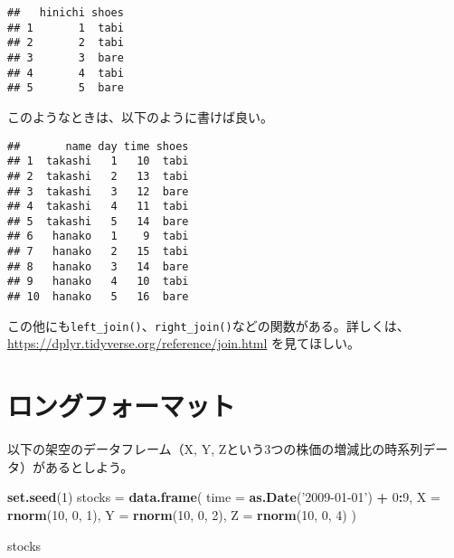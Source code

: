 \documentclass[]{book}
\newenvironment{Shaded}{\begin{snugshade}}{\end{snugshade}}
\newcommand{\KeywordTok}[1]{\textcolor[rgb]{0.13,0.29,0.53}{\textbf{#1}}}
\newcommand{\DataTypeTok}[1]{\textcolor[rgb]{0.13,0.29,0.53}{#1}}
\newcommand{\DecValTok}[1]{\textcolor[rgb]{0.00,0.00,0.81}{#1}}
\newcommand{\StringTok}[1]{\textcolor[rgb]{0.31,0.60,0.02}{#1}}
\newcommand{\CommentTok}[1]{\textcolor[rgb]{0.56,0.35,0.01}{\textit{#1}}}
\newcommand{\OperatorTok}[1]{\textcolor[rgb]{0.81,0.36,0.00}{\textbf{#1}}}
\newcommand{\NormalTok}[1]{#1}
\begin{document}
\begin{verbatim}
##   hinichi shoes
## 1       1  tabi
## 2       2  tabi
## 3       3  bare
## 4       4  tabi
## 5       5  bare
\end{verbatim}

このようなときは、以下のように書けば良い。

\begin{Shaded}
\end{Shaded}

\begin{verbatim}
##       name day time shoes
## 1  takashi   1   10  tabi
## 2  takashi   2   13  tabi
## 3  takashi   3   12  bare
## 4  takashi   4   11  tabi
## 5  takashi   5   14  bare
## 6   hanako   1    9  tabi
## 7   hanako   2   15  tabi
## 8   hanako   3   14  bare
## 9   hanako   4   10  tabi
## 10  hanako   5   16  bare
\end{verbatim}

この他にも\texttt{left\_join()}、\texttt{right\_join()}などの関数がある。詳しくは、\url{https://dplyr.tidyverse.org/reference/join.html}
を見てほしい。

\section{ロングフォーマット}

以下の架空のデータフレーム（X, Y,
Zという3つの株価の増減比の時系列データ）があるとしよう。

\begin{Shaded}
\begin{Highlighting}[]
\KeywordTok{set.seed}\NormalTok{(}\DecValTok{1}\NormalTok{)}
\NormalTok{stocks =}\StringTok{ }\KeywordTok{data.frame}\NormalTok{(}
  \DataTypeTok{time =} \KeywordTok{as.Date}\NormalTok{(}\StringTok{'2009-01-01'}\NormalTok{) }\OperatorTok{+}\StringTok{ }\DecValTok{0}\OperatorTok{:}\DecValTok{9}\NormalTok{,}
  \DataTypeTok{X =} \KeywordTok{rnorm}\NormalTok{(}\DecValTok{10}\NormalTok{, }\DecValTok{0}\NormalTok{, }\DecValTok{1}\NormalTok{),}
  \DataTypeTok{Y =} \KeywordTok{rnorm}\NormalTok{(}\DecValTok{10}\NormalTok{, }\DecValTok{0}\NormalTok{, }\DecValTok{2}\NormalTok{),}
  \DataTypeTok{Z =} \KeywordTok{rnorm}\NormalTok{(}\DecValTok{10}\NormalTok{, }\DecValTok{0}\NormalTok{, }\DecValTok{4}\NormalTok{)}
\NormalTok{)}

\NormalTok{stocks}
\end{Highlighting}
\end{Shaded}
\end{document}
